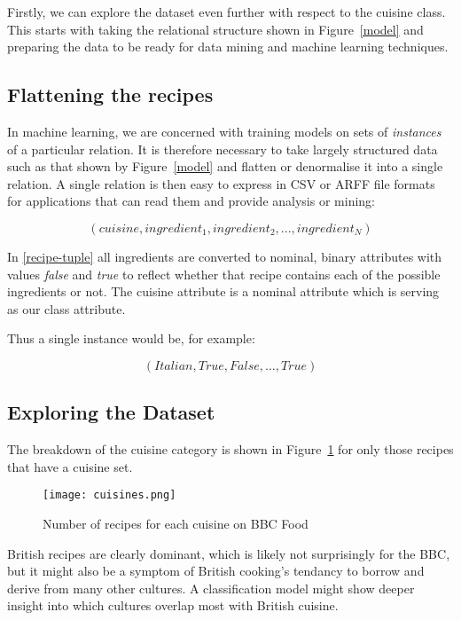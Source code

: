\documentclass[11pt,a4paper]{article}
\begin{document}
Firstly, we can explore the dataset even further with respect to the cuisine class.
This starts with taking the relational structure shown in Figure~\ref{model} and
preparing the data to be ready for data mining and machine learning techniques.

\subsection{Flattening the recipes}

In machine learning, we are concerned with training models on sets of \emph{instances}
of a particular relation. It is therefore necessary to take largely structured
data such as that shown by Figure~\ref{model} and flatten or denormalise it into
a single relation. A single relation is then easy to express in CSV or ARFF file
formats for applications that can read them and provide analysis or mining:

\begin{equation} \label{recipe-tuple}
(cuisine, ingredient_1, ingredient_2, ... ,ingredient_N)
\end{equation}

In \eqref{recipe-tuple} all ingredients are converted to nominal, binary attributes
with values \emph{false} and \emph{true} to reflect whether that recipe contains
each of the possible ingredients or not. The cuisine attribute is a nominal
attribute which is serving as our class attribute.

Thus a single instance would be, for example:

\begin{equation} \label{recipe-example}
(Italian, True, False, ... ,True)
\end{equation}


\subsection{Exploring the Dataset}

The breakdown of the cuisine category is shown in Figure~\ref{cuisines-barchart}
for only those recipes that have a cuisine set.

\begin{figure}[p]
  \texttt{[image: cuisines.png]}
  \caption{Number of recipes for each cuisine on BBC Food\label{cuisines-barchart}}
\end{figure}

British recipes are clearly dominant, which is likely not surprisingly for the
BBC, but it might also be a symptom of British cooking's tendancy to borrow and
derive from
many other cultures. A classification model might show deeper insight into which
cultures overlap most with British cuisine.
\end{document}
